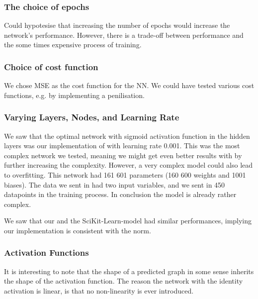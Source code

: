         \subsubsection{The choice of epochs}
            Could hypotesise that increasing the number of epochs would increase the network's performance. However, there is a trade-off between performance and the some times expensive process of training. 

        \subsubsection{Choice of cost function}
            We chose MSE as the cost function for the NN. We could have tested various cost functions, e.g. by implementing a penilisation. 

        \subsubsection{Varying Layers, Nodes, and Learning Rate}
            We saw that the optimal network with sigmoid activation function in the hidden layers was our implementation of  with learning rate 0.001. This was the most complex network we tested, meaning we might get even better results with by further increasing the complexity. However, a very complex model could also lead to overfitting. This network had 161 601 parameters (160 600 weights and 1001 biases). The data we sent in had two input variables, and we sent in 450 datapoints in the training process. In conclusion the model is already rather complex. 
            
            We saw that our and the SciKit-Learn-model had similar performances, implying our implementation is consistent with the norm.


        \subsubsection{Activation Functions}
            It is interesting to note that the shape of a predicted graph in some sense inherits the shape of the activation function. The reason the network with the identity activation is linear, is that no non-linearity is ever introduced.
            

